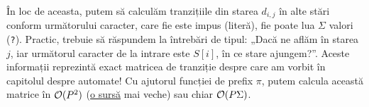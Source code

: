 \documentclass[../main.tex]{subfiles}
\begin{document}
În loc de aceasta, putem să calculăm tranzițiile din starea $d_{i,j}$ în alte stări conform următorului caracter, care fie este impus (literă), fie poate lua $\Sigma$ valori (\texttt{?}). Practic, trebuie să răspundem la întrebări de tipul: „Dacă ne aflăm în starea $j$, iar următorul caracter de la intrare este $S[i]$, în ce stare ajungem?”. Aceste informații reprezintă exact matricea de tranziție despre care am vorbit în capitolul despre automate! Cu ajutorul funcției de prefix $\pi$, putem calcula această matrice în $\mathcal{O}(P^2)$ (\href{https://codeforces.com/contest/808/submission/376033109}{o sursă} mai veche) sau chiar $\mathcal{O}(P \Sigma)$.
\end{document}
